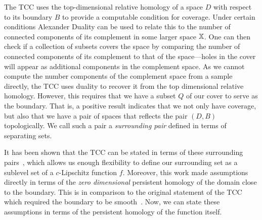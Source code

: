 
The TCC uses the top-dimensional relative homology of a space $D$ with respect to its boundary $B$ to provide a computable condition for coverage.
Under certain conditions Alexander Duality can be used to relate this to the number of connected components of its complement in some larger space $\mathbb{X}$.
One can then check if a collection of subsets covers the space by comparing the number of connected components of its complement to that of the space---holes in the cover will appear as additional components in the complement space.
As we cannot compute the number components of the complement space from a sample directly, the TCC uses duality to recover it from the top dimensional relative homology.
However, this requires that we have a subset $Q$ of our cover to serve as the boundary.
That is, a positive result indicates that we not only have coverage, but also that we have a pair of spaces that reflects the pair $(D, B)$ topologically.
We call such a pair a \emph{surrounding pair} defined in terms of separating sets.

It has been shown that the TCC can be stated in terms of these surrounding pairs~\cite{cavanna2017when}, which allows us enough flexibility to define our surrounding set as a sublevel set of a $c$-Lipschitz function $f$.
Moreover, this work made assumptions directly in terms of the \emph{zero dimensional} persistent homology of the domain close to the boundary.
This is in comparison to the original statement of the TCC which required the boundary to be smooth~\cite{desilva07coverage}.
Now, we can state these assumptions in terms of the persistent homology of the function itself.

